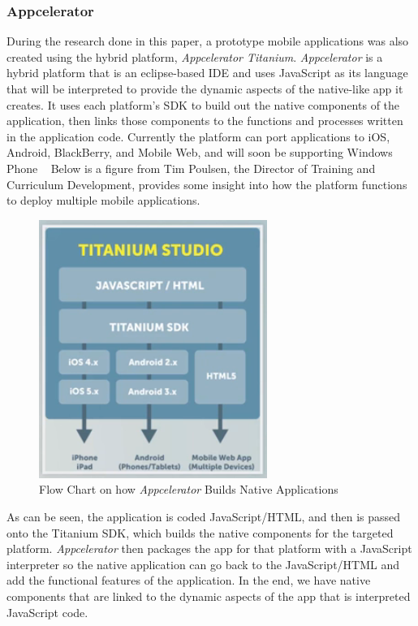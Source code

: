 \documentclass[11pt, twocolumn]{article}
\begin{document}
\subsubsection{Appcelerator}
During the research done in this paper, a prototype mobile applications was also created using the hybrid platform, {\it Appcelerator Titanium}. {\it Appcelerator} is a hybrid platform that is an eclipse-based IDE and uses JavaScript as its language that will be interpreted to provide the dynamic aspects of the native-like app it creates.  It uses each platform's SDK to build out the native components of the application, then links those components to the functions and processes written in the application code.  Currently the platform can port applications to iOS, Android, BlackBerry, and Mobile Web, and will soon be supporting Windows Phone ~\cite{Appcelerator.com2012}  Below is a figure from Tim Poulsen, the Director of Training and Curriculum Development, provides some insight into how the platform functions to deploy multiple mobile applications.

\begin{figure}[h]
\includegraphics[scale=1]{appcelerator-flow-chart}
\caption{Flow Chart on how {\it Appcelerator} Builds Native Applications ~\cite{Poulsen2012}}
\end{figure}

As can be seen, the application is coded JavaScript/HTML, and then is passed onto the Titanium SDK, which builds the native components for the targeted platform.  {\it Appcelerator} then packages the app for that platform with a JavaScript interpreter so the native application can go back to the JavaScript/HTML and add the functional features of the application.  In the end, we have native components that are linked to the dynamic aspects of the app that is interpreted JavaScript code.\\
\end{document}

